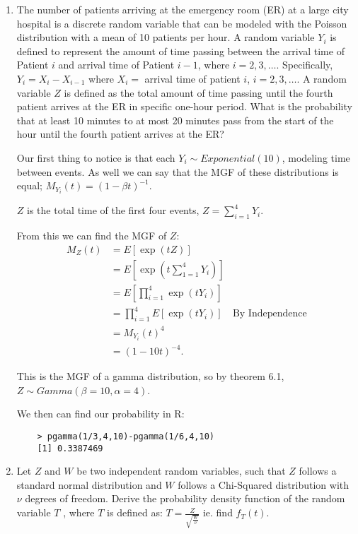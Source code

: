 \documentclass{article}
\begin{document}
\begin{enumerate}
\newpage

\item The number of patients arriving at the emergency room (ER) at a large city hospital is a discrete random variable that can be modeled with the Poisson distribution with a mean of 10 patients per hour. A random variable $Y_i$ is defined to represent the amount of time passing between the arrival time of Patient $i$ and arrival time of Patient $i - 1$, where $i = 2, 3, \ldots$. Specifically, 
    $Y_i = X_i - X_{i-1}$ where $X_i =$ arrival time of patient $i$, $i = 2, 3, \ldots$. A random variable $Z$ is defined as the total amount of time passing until the fourth patient arrives at the ER in specific one-hour period. What is the probability that at least 10 minutes to at most 20 minutes pass
from the start of the hour until the fourth patient arrives at the ER? 

Our first thing to notice is that each $Y_i\sim Exponential(10)$, modeling time between events. As well we can say that the MGF of these distributions is equal; $M_{Y_i}(t)=(1-\beta t)^{-1}$.

$Z$ is the total time of the first four events, $Z=\sum_{i=1}^{4} Y_i$.

From this we can find the MGF of $Z$:
\begin{align*}
    M_Z(t)&=E[\exp(tZ)]\\
          &= E[\exp(t\sum_{1=1}^{4} Y_i)] \\
          &= E[\prod_{i=1}^{4}  \exp(t Y_i)] \\
          &= \prod_{i=1}^{4} E[ \exp(t Y_i)] &\text{By Independence}\\
          &= M_{Y_i}(t)^{4} \\
          &= (1-10t)^{-4} 
.\end{align*}

This is the MGF of a gamma distribution, so by theorem 6.1, $Z\sim Gamma(\beta=10,\alpha=4)$.

We then can find our probability in R:
\begin{verbatim}
    > pgamma(1/3,4,10)-pgamma(1/6,4,10)
    [1] 0.3387469
\end{verbatim}
\newpage
\item Let $Z$ and $W$ be two independent random variables, such that $Z$ follows a standard normal distribution and $W$ follows a Chi-Squared distribution with $\nu$ degrees of freedom. Derive the probability density function of the random variable $T$ , where $T$ is defined as:
$T = \frac{Z}{\sqrt{\frac{W}\nu} }$
ie. find $f_T (t)$.


\end{enumerate}
\end{document}
